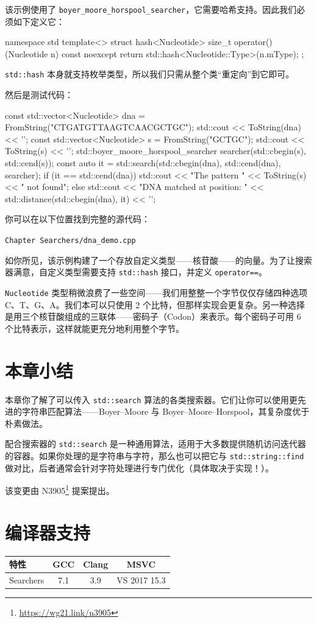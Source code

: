 该示例使用了 \texttt{boyer\_moore\_horspool\_searcher}，它需要哈希支持。因此我们必须如下定义它：

\begin{codebox}[cpp]
namespace std
{
template<> struct hash<Nucleotide>
{
size_t operator()(Nucleotide n) const noexcept
{
return std::hash<Nucleotide::Type>{}(n.mType);
}
};
}
\end{codebox}

\texttt{std::hash} 本身就支持枚举类型，所以我们只需从整个类“重定向”到它即可。

然后是测试代码：

\begin{codebox}[cpp]
const std::vector<Nucleotide> dna = FromString("CTGATGTTAAGTCAACGCTGC");
std::cout << ToString(dna) << '\n';
const std::vector<Nucleotide> s = FromString("GCTGC");
std::cout << ToString(s) << '\n';
std::boyer_moore_horspool_searcher searcher(std::cbegin(s), std::cend(s));
const auto it = std::search(std::cbegin(dna), std::cend(dna), searcher);
if (it == std::cend(dna))
std::cout << "The pattern " << ToString(s) << " not found\n";
else
{
std::cout << "DNA matched at position: "
<< std::distance(std::cbegin(dna), it) << '\n';
}
\end{codebox}

你可以在以下位置找到完整的源代码：

\texttt{Chapter Searchers/dna\_demo.cpp}

如你所见，该示例构建了一个存放自定义类型——核苷酸——的向量。为了让搜索器满意，自定义类型需要支持 \texttt{std::hash} 接口，并定义 \texttt{operator==}。

\texttt{Nucleotide} 类型稍微浪费了一些空间——我们用整整一个字节仅仅存储四种选项 C、T、G、A。我们本可以只使用 2 个比特，但那样实现会更复杂。另一种选择是用三个核苷酸组成的三联体——密码子（Codon）来表示。每个密码子可用 6 个比特表示，这样就能更充分地利用整个字节。

\section{本章小结}

本章你了解了可以传入 \texttt{std::search} 算法的各类搜索器。它们让你可以使用更先进的字符串匹配算法——Boyer–Moore 与 Boyer–Moore–Horspool，其复杂度优于朴素做法。

配合搜索器的 \texttt{std::search} 是一种通用算法，适用于大多数提供随机访问迭代器的容器。如果你处理的是字符串与字符，那么也可以把它与 \texttt{std::string::find} 做对比，后者通常会针对字符处理进行专门优化（具体取决于实现！）。

\begin{myInfoBox}
该变更由 N3905\footnote{\url{https://wg21.link/n3905}} 提案提出。
\end{myInfoBox}

\section{编译器支持}

\begin{table}[H]
\centering
\begin{tabularx}{\textwidth}{X c c c}
\toprule
特性 & GCC & Clang & MSVC \\
\midrule
Searchers & 7.1 & 3.9 & VS 2017 15.3 \\
\bottomrule
\end{tabularx}
\end{table}
